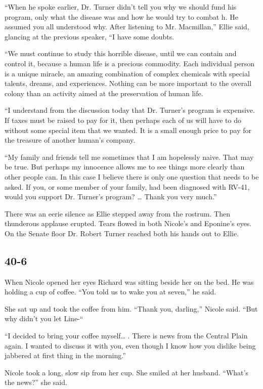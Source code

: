 \documentclass[]{article}
\begin{document}
{“When he spoke earlier, Dr.  Turner didn’t tell you why we should fund his program, only what the disease was and how he would try to combat h.  He assumed you all understood why.  After listening to Mr.  Macmillan,” Ellie said, glancing at the previous speaker, “I have some doubts.

“We must continue to study this horrible disease, until we can contain and control it, because a human life is a precious commodity.  Each individual person is a unique miracle, an amazing combination of complex chemicals with special talents, dreams, and experiences.  Nothing can be more important to the overall colony than an activity aimed at the preservation of human life.

“I understand from the discussion today that Dr.  Turner’s program is expensive.  If taxes must be raised to pay for it, then perhaps each of us will have to do without some special item that we wanted.  It is a small enough price to pay for the treasure of another human’s company.

“My family and friends tell me sometimes that I am hopelessly naive.  That may be true.  But perhaps my innocence allows me to see things more clearly than other people can.  In this case I believe there is only one question that needs to be asked.  If you, or some member of your family, had been diagnosed with RV-41, would you support Dr.  Turner’s program? … Thank you very much.”

There was an eerie silence as Ellie stepped away from the rostrum.  Then thunderous applause erupted.  Tears flowed in both Nicole’s and Eponine’s eyes.  On the Senate floor Dr.  Robert Turner reached both his hands out to Ellie.


\subsection*{40-6}

When Nicole opened her eyes Richard was sitting beside her on the bed.  He was holding a cup of coffee.  “You told us to wake you at seven,” he said.

She sat up and took the coffee from him.  “Thank you, darling,” Nicole said.  “But why didn’t you let Line-“

“I decided to bring your coffee myself… .  There is news from the Central Plain again.  I wanted to discuss it with you, even though I know how you dislike being jabbered at first thing in the morning.”

Nicole took a long, slow sip from her cup.  She smiled at her husband.  “What’s the news?” she said.

}
\end{document}
